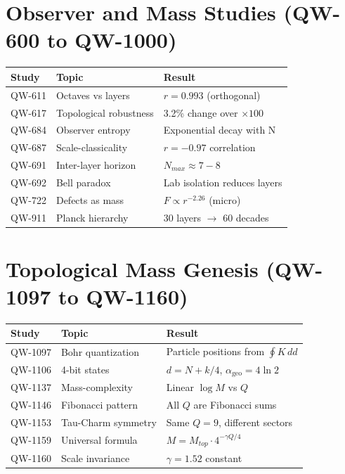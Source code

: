 \documentclass[11pt,a4paper]{book}
\theoremstyle{remark}
\newcommand{\alphageo}{\alpha_{\text{geo}}}
\begin{document}
\section{Observer and Mass Studies (QW-600 to QW-1000)}

\begin{center}
\begin{longtable}{|l|l|l|}
\hline
\textbf{Study} & \textbf{Topic} & \textbf{Result} \\
\hline
QW-611 & Octaves vs layers & $r = 0.993$ (orthogonal) \\
QW-617 & Topological robustness & 3.2\% change over $\times 100$ \\
QW-684 & Observer entropy & Exponential decay with N \\
QW-687 & Scale-classicality & $r = -0.97$ correlation \\
QW-691 & Inter-layer horizon & $N_{max} \approx 7-8$ \\
QW-692 & Bell paradox & Lab isolation reduces layers \\
QW-722 & Defects as mass & $F \propto r^{-2.26}$ (micro) \\
QW-911 & Planck hierarchy & 30 layers $\to$ 60 decades \\
\hline
\end{longtable}
\end{center}

\section{Topological Mass Genesis (QW-1097 to QW-1160)}

\begin{center}
\begin{longtable}{|l|l|l|}
\hline
\textbf{Study} & \textbf{Topic} & \textbf{Result} \\
\hline
QW-1097 & Bohr quantization & Particle positions from $\oint K \, dd$ \\
QW-1106 & 4-bit states & $d = N + k/4$, $\alphageo = 4\ln 2$ \\
QW-1137 & Mass-complexity & Linear $\log M$ vs $Q$ \\
QW-1146 & Fibonacci pattern & All $Q$ are Fibonacci sums \\
QW-1153 & Tau-Charm symmetry & Same $Q=9$, different sectors \\
QW-1159 & Universal formula & $M = M_{top} \cdot 4^{-\gamma Q/4}$ \\
QW-1160 & Scale invariance & $\gamma = 1.52$ constant \\
\hline
\end{longtable}
\end{center}
\end{document}
